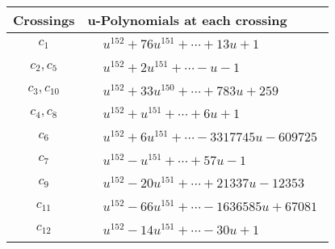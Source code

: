 \documentclass[1p]{elsarticle_modified}
\theoremstyle{definition}
\begin{document}
\begin{tabular}{m{50pt}|m{274pt}}
Crossings & \hspace{64pt}u-Polynomials at each crossing \\
\hline $$\begin{aligned}c_{1}\end{aligned}$$&$\begin{aligned}
&u^{152}+76 u^{151}+\cdots+13 u+1
\end{aligned}$\\
\hline $$\begin{aligned}c_{2},c_{5}\end{aligned}$$&$\begin{aligned}
&u^{152}+2 u^{151}+\cdots- u-1
\end{aligned}$\\
\hline $$\begin{aligned}c_{3},c_{10}\end{aligned}$$&$\begin{aligned}
&u^{152}+33 u^{150}+\cdots+783 u+259
\end{aligned}$\\
\hline $$\begin{aligned}c_{4},c_{8}\end{aligned}$$&$\begin{aligned}
&u^{152}+u^{151}+\cdots+6 u+1
\end{aligned}$\\
\hline $$\begin{aligned}c_{6}\end{aligned}$$&$\begin{aligned}
&u^{152}+6 u^{151}+\cdots-3317745 u-609725
\end{aligned}$\\
\hline $$\begin{aligned}c_{7}\end{aligned}$$&$\begin{aligned}
&u^{152}- u^{151}+\cdots+57 u-1
\end{aligned}$\\
\hline $$\begin{aligned}c_{9}\end{aligned}$$&$\begin{aligned}
&u^{152}-20 u^{151}+\cdots+21337 u-12353
\end{aligned}$\\
\hline $$\begin{aligned}c_{11}\end{aligned}$$&$\begin{aligned}
&u^{152}-66 u^{151}+\cdots-1636585 u+67081
\end{aligned}$\\
\hline $$\begin{aligned}c_{12}\end{aligned}$$&$\begin{aligned}
&u^{152}-14 u^{151}+\cdots-30 u+1
\end{aligned}$\\
\hline
\end{tabular}\\~\\
\end{document}
